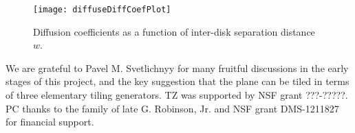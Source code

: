 \documentclass[aps,pre,
                showpacs,
                twocolumn,
                groupedaddress,
                floatfix]{revtex4-1}
\begin{document}
\begin{figure}
  \texttt{[image: diffuseDiffCoefPlot]}
  \caption[]{\label{fig-results} Diffusion coefficients as a function
    of inter-disk separation distance $w$.}
\end{figure}



\begin{acknowledgments}
We are grateful to Pavel M. Svetlichnyy for many fruitful discussions in
the early stages of this project, and the key suggestion that the plane
can be tiled in terms of three elementary tiling generators.
TZ was supported by NSF grant ???-?????.
PC thanks to the family of late G. Robinson, Jr. and NSF grant
DMS-1211827 for financial support.
\end{acknowledgments}

\ifboyscout
\newpage
    
\fi




% 
\end{document}
